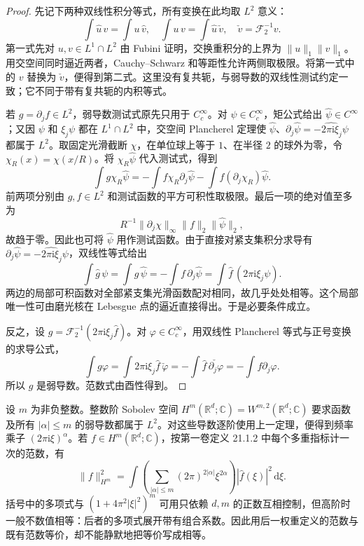 \begin{proof}
先记下两种双线性积分等式，所有变换在此均取 \(L^2\) 意义：
\[
 \int\widehat u\,v=\int u\,\widehat v,
 \quad \int u\,v=\int\widehat u\,\check v,
 \quad \check v=\mathcal F_2^{-1}v.
\]
第一式先对 \(u,v\in L^1\cap L^2\) 由 Fubini 证明，交换重积分的上界为 \(\|u\|_1\|v\|_1\)。用交空间同时逼近两者，Cauchy--Schwarz 和等距性允许两侧取极限。将第一式中的 \(v\) 替换为 \(\check v\)，便得到第二式。这里没有复共轭，与弱导数的双线性测试约定一致；它不同于带有复共轭的内积等式。

若 \(g=\partial_jf\in L^2\)，弱导数测试式原先只用于 \(C_c^\infty\)。对 \(\psi\in C_c^\infty\)，矩公式给出 \(\widehat\psi\in C^\infty\)；又因 \(\psi\) 和 \(\xi_j\psi\) 都在 \(L^1\cap L^2\) 中，交空间 Plancherel 定理使 \(\widehat\psi\)、\(\partial_j\widehat\psi=\widehat{-2\pi\mathrm i\xi_j\psi}\) 都属于 \(L^2\)。取固定光滑截断 \(\chi\)，在单位球上等于 \(1\)、在半径 \(2\) 的球外为零，令 \(\chi_R(x)=\chi(x/R)\)。将 \(\chi_R\widehat\psi\) 代入测试式，得到
\[
 \int g\chi_R\widehat\psi
 =-\int f\chi_R\partial_j\widehat\psi
   -\int f(\partial_j\chi_R)\widehat\psi.
\]
前两项分别由 \(g,f\in L^2\) 和测试函数的平方可积性取极限。最后一项的绝对值至多为
\[
 R^{-1}\|\partial_j\chi\|_\infty\|f\|_2\|\widehat\psi\|_2,
\]
故趋于零。因此也可将 \(\widehat\psi\) 用作测试函数。由于直接对紧支集积分求导有 \(\partial_j\widehat\psi=\widehat{-2\pi\mathrm{i}\xi_j\psi}\)，双线性等式给出
\[
 \int\widehat g\,\psi
 =\int g\,\widehat\psi
 =-\int f\,\partial_j\widehat\psi
 =\int\widehat f\,(2\pi\mathrm{i}\xi_j\psi).
\]
两边的局部可积函数对全部紧支集光滑函数配对相同，故几乎处处相等。这个局部唯一性可由磨光核在 Lebesgue 点的逼近直接得出。于是必要条件成立。

反之，设 \(g=\mathcal F_2^{-1}(2\pi\mathrm{i}\xi_j\widehat f)\)。对 \(\varphi\in C_c^\infty\)，用双线性 Plancherel 等式与正号变换的求导公式，
\[
 \int g\varphi
 =\int2\pi\mathrm{i}\xi_j\widehat f\,\check\varphi
 =-\int\widehat f\,\check{\partial_j\varphi}
 =-\int f\partial_j\varphi.
\]
所以 \(g\) 是弱导数。范数式由酉性得到。
\end{proof}

设 \(m\) 为非负整数。整数阶 Sobolev 空间 \(H^m(\mathbb R^d;\mathbb C)=W^{m,2}(\mathbb R^d;\mathbb C)\) 要求函数及所有 \(|\alpha|\leq m\) 的弱导数都属于 \(L^2\)。对这些导数逐阶使用上一定理，便得到频率乘子 \((2\pi\mathrm i\xi)^\alpha\)。若 \(f\in H^m(\mathbb R^d;\mathbb C)\)，按第一卷定义 21.1.2 中每个多重指标计一次的范数，有
\[
 \|f\|_{H^m}^2
 =\int\left(\sum_{|\alpha|\leq m}(2\pi)^{2|\alpha|}\xi^{2\alpha}\right)|\widehat f(\xi)|^2\,\mathrm{d}\xi.
\]
括号中的多项式与 \((1+4\pi^2|\xi|^2)^m\) 可用只依赖 \(d,m\) 的正数互相控制，但高阶时一般不数值相等：后者的多项式展开带有组合系数。因此用后一权重定义的范数与既有范数等价，却不能静默地把等价写成相等。

